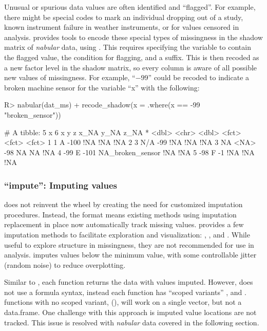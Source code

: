 \documentclass[article]{jss}
\begin{document}
Unusual or spurious data values are often identified and ``flagged''.  For
example, there might be special codes to mark an individual dropping out of
a study, known instrument failure in weather instruments, or for values
censored in analysis.   provides tools to encode these special
types of missingness in the shadow matrix of \emph{nabular} data, using
.  This requires specifying the variable to contain
the flagged value, the condition for flagging, and a suffix.  This is then
recoded as a new factor level in the shadow matrix, so every column is aware
of all possible new values of missingness.  For example, ``$-99$'' could be
recoded to indicate a broken machine sensor for the variable ``x'' with the
following:
%
\begin{CodeChunk}
\begin{CodeInput}
R> nabular(dat_ms) %
+    recode_shadow(x = .where(x == -99 ~ "broken_sensor"))
\end{CodeInput}
\begin{CodeOutput}
# A tibble: 5 x 6
      x y         z x_NA             y_NA  z_NA
* <dbl> <chr> <dbl> <fct>            <fct> <fct>
1     1 A      -100 !NA              !NA   !NA
2     3 N/A     -99 !NA              !NA   !NA
3    NA <NA>    -98 NA               NA    !NA
4   -99 E      -101 NA_broken_sensor !NA   !NA
5   -98 F        -1 !NA              !NA   !NA
\end{CodeOutput}
\end{CodeChunk}
%
\hypertarget{verbs-impute}{%
\subsubsection{``impute'': Imputing values}\label{verbs-impute}}

 does not reinvent the wheel by creating the need for customized
imputation procedures.  Instead, the  format means existing
methods using imputation replacement in place now automatically track
missing values.   provides a few imputation methods to
facilitate exploration and visualization: ,
, and .  While useful to explore
structure in missingness, they are not recommended for use in analysis.
 imputes values below the minimum value, with some
controllable jitter (random noise) to reduce overplotting.

Similar to , each  function returns the data
with values imputed.  However,  does not use a formula syntax,
instead each function has ``scoped variants'' ,  and
.   functions with no scoped variant,
(), will work on a single vector, but not a data.frame.
One challenge with this approach is imputed value locations are not tracked.
This issue is resolved with \emph{nabular} data covered in the following
section.
\end{document}
